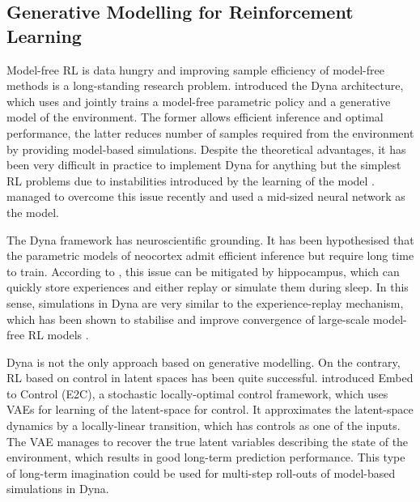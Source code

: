     \subsection{Generative Modelling for Reinforcement Learning}
        Model-free RL is data hungry and improving sample efficiency of model-free methods is a long-standing research problem. \cite{Sutton1991} introduced the Dyna architecture, which uses and jointly trains a model-free parametric policy and a generative model of the environment. The former allows efficient inference and optimal performance, the latter reduces number of samples required from the environment by providing model-based simulations.
        Despite the theoretical advantages, it has been very difficult in practice to implement Dyna for anything but the simplest RL problems due to instabilities introduced by the learning of the model \citep{Gu2016}. \cite{Nagabandi2017} managed to overcome this issue recently and used a mid-sized neural network as the model. 
        
        The Dyna framework has neuroscientific grounding. It has been hypothesised that the parametric models of neocortex admit efficient inference but require long time to train. According to \cite{Kumaran2016}, this issue can be mitigated by hippocampus, which can quickly store experiences and either replay or simulate them during sleep. In this sense, simulations in Dyna are very similar to the experience-replay mechanism, which has been shown to stabilise and improve convergence of large-scale model-free RL models \citep{Mnih2015}.
        
        Dyna is not the only approach based on generative modelling. On the contrary, RL based on control in latent spaces has been quite successful. \cite{Watter2015} introduced Embed to Control (E2C), a stochastic locally-optimal control framework, which uses VAEs for learning of the latent-space for control. It approximates the latent-space dynamics by a locally-linear transition, which has controls as one of the inputs. The VAE manages to recover the true latent variables describing the state of the environment, which results in good long-term prediction performance. This type of long-term imagination could be used for multi-step roll-outs of model-based simulations in Dyna.
        

